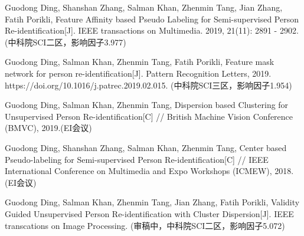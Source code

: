 \begin{publication}{99}
\item[] {}
\item Guodong Ding, Shanshan Zhang, Salman Khan, Zhenmin Tang, Jian Zhang, Fatih Porikli, Feature Affinity based Pseudo Labeling for Semi-supervised Person Re-identification[J]. IEEE transactions on Multimedia. 2019, 21(11): 2891 - 2902. (中科院SCI二区，影响因子3.977)

\item Guodong Ding, Salman Khan, Zhenmin Tang, Fatih Porikli, Feature mask network for person re-identification[J]. Pattern Recognition Letters, 2019. https://doi.org/10.1016/j.patrec.2019.02.015. (中科院SCI三区，影响因子1.954)

\item Guodong Ding, Salman Khan, Zhenmin Tang, Dispersion based Clustering for Unsupervised Person Re-identification[C] // British Machine Vision Conference (BMVC), 2019.(EI会议)

\item Guodong Ding, Shanshan Zhang, Salman Khan, Zhenmin Tang, Center based Pseudo-labeling for Semi-supervised Person Re-identification[C] // IEEE International Conference on Multimedia and Expo Workshops (ICMEW), 2018.(EI会议)

\item Guodong Ding, Salman Khan, Zhenmin Tang, Jian Zhang, Fatih Porikli, Validity Guided Unsupervised Person Re-identification with Cluster Dispersion[J]. IEEE transcations on Image Processing. (审稿中，中科院SCI二区，影响因子5.072)


\end{publication}